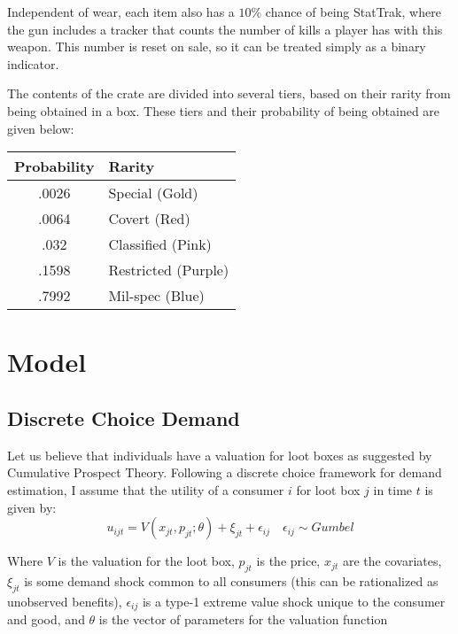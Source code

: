 \documentclass[12pt]{paper}
\begin{document}
Independent of wear, each item
also has a $10\%$ chance of being StatTrak\texttrademark, where the
gun includes a tracker that counts the number of kills a player has
with this weapon. This number is reset on sale, so it can be treated
simply as a binary indicator.

The contents of the crate are divided into several tiers, based on
their rarity from being obtained in a box. These tiers and their
probability of being obtained are given below:

\begin{center}
\begin{tabular}{|c|l|}\hline
Probability & Rarity\\\hline
.0026 & Special (Gold)\\
.0064 & Covert (Red)\\
.032 & Classified (Pink)\\
.1598 & Restricted (Purple)\\
.7992 & Mil-spec (Blue)\\\hline
\end{tabular}
\end{center}

\section{Model}

\subsection{Discrete Choice Demand}



Let us believe that individuals have a valuation for loot boxes as
suggested by Cumulative Prospect Theory. Following a discrete choice
framework for demand estimation, I assume that the utility of a
consumer $i$ for loot box $j$ in time $t$ is given by:
\begin{equation*}
  u_{ijt} = V( x_{jt}, p_{jt}; \theta ) + \xi_{jt} + \epsilon_{ij} \quad \epsilon_{ij} \sim Gumbel
\end{equation*}

Where $V$ is the valuation for the loot box, $p_{jt}$ is the price,
$x_{jt}$ are the covariates, $\xi_{jt}$ is some demand shock common to
all consumers (this can be rationalized as unobserved benefits), 
$\epsilon_{ij}$ is a type-1 extreme value shock unique to the consumer and
good, and $\theta$ is the vector of parameters for the valuation function
\end{document}
